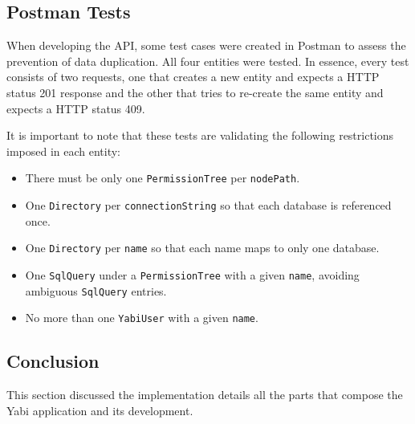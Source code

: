 \subsection{Postman Tests}
When developing the \gls{API}, some test cases were created in Postman to assess the prevention of data duplication. All four entities were tested.
In essence, every test consists of two requests, one that creates a new entity and expects a \gls{HTTP} status 201 response and the other that tries to re-create the same entity and expects a \gls{HTTP} status 409.

It is important to note that these tests are validating the following restrictions imposed in each entity:
\begin{itemize}
\item There must be only one \texttt{PermissionTree} per \texttt{nodePath}.
\item One \texttt{Directory} per \texttt{connectionString} so that each database is referenced once.
\item One \texttt{Directory} per \texttt{name} so that each name maps to only one database.
\item One \texttt{SqlQuery} under a \texttt{PermissionTree} with a given \texttt{name}, avoiding ambiguous \texttt{SqlQuery} entries.
\item No more than one \texttt{YabiUser} with a given \texttt{name}.
\end{itemize}

\subsection{Conclusion}
This section discussed the implementation details all the parts that compose the \gls{Yabi} application and its development.



